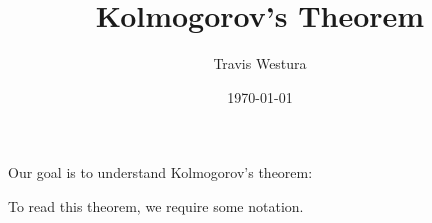 \documentclass[twoside,letterpaper,10pt]{article}
\title{Kolmogorov's Theorem}
\author{Travis Westura}
\date{\today}
\begin{document}
\maketitle

Our goal is to understand Kolmogorov's theorem:
\begin{thm}
  \KAM
\end{thm}
To read this theorem, we require some notation.
\end{document}
